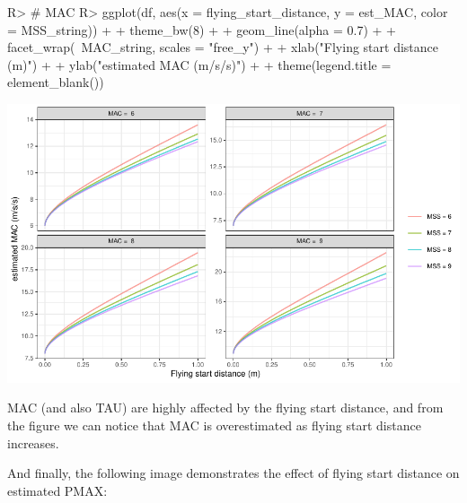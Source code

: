 \documentclass[
]{jss}
\begin{document}
\begin{CodeChunk}
\begin{CodeInput}
R> # MAC
R> ggplot(df, aes(x = flying_start_distance, y = est_MAC, color = MSS_string)) +
+   theme_bw(8) +
+   geom_line(alpha = 0.7) +
+   facet_wrap(~MAC_string, scales = "free_y") +
+   xlab("Flying start distance (m)") +
+   ylab("estimated MAC (m/s/s)") +
+   theme(legend.title = element_blank())
\end{CodeInput}


\begin{center}\includegraphics[width=1\linewidth]{paper_files/figure-latex/unnamed-chunk-28-1} \end{center}

\end{CodeChunk}

MAC (and also TAU) are highly affected by the flying start distance, and from the figure we can notice that MAC is overestimated as flying start distance increases.

And finally, the following image demonstrates the effect of flying start distance on estimated PMAX:
\end{document}
